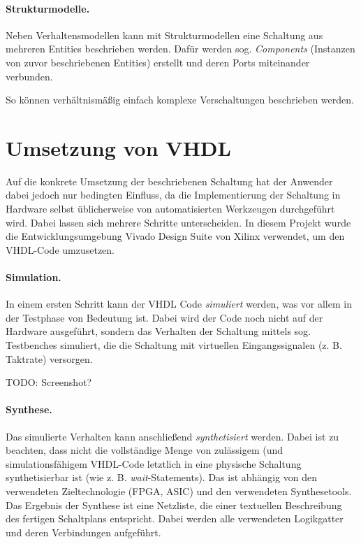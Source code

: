 \paragraph{Strukturmodelle.} Neben Verhaltensmodellen kann mit Strukturmodellen eine Schaltung aus mehreren Entities beschrieben werden. Dafür werden sog. \textit{Components} (Instanzen von zuvor beschriebenen Entities) erstellt und deren Ports miteinander verbunden.

So können verhältnismäßig einfach komplexe Verschaltungen beschrieben werden.
 
\section{Umsetzung von VHDL}
Auf die konkrete Umsetzung der beschriebenen Schaltung hat der Anwender dabei jedoch nur bedingten Einfluss, da die Implementierung der Schaltung in Hardware selbst üblicherweise von automatisierten Werkzeugen durchgeführt wird. Dabei lassen sich mehrere Schritte unterscheiden. In diesem Projekt wurde die Entwicklungsumgebung Vivado Design Suite von Xilinx verwendet, um den VHDL-Code umzusetzen.

\paragraph{Simulation.} In einem ersten Schritt kann der VHDL Code \emph{simuliert} werden, was vor allem in der Testphase von Bedeutung ist. Dabei wird der Code noch nicht auf der Hardware ausgeführt, sondern das Verhalten der Schaltung mittels sog. Testbenches simuliert, die die Schaltung mit virtuellen Eingangssignalen (z. B. Taktrate) versorgen. 

TODO: Screenshot?

\paragraph{Synthese.} Das simulierte Verhalten kann anschließend \emph{synthetisiert} werden. Dabei ist zu beachten, dass nicht die vollständige Menge von zulässigem (und simulationsfähigem VHDL-Code letztlich in eine physische Schaltung synthetisierbar ist (wie z. B. \emph{wait}-Statements). Das ist abhängig von den verwendeten Zieltechnologie (FPGA, ASIC) und den verwendeten Synthesetools. Das Ergebnis der Synthese ist eine Netzliste, die einer textuellen Beschreibung des fertigen Schaltplans entspricht. Dabei werden alle verwendeten Logikgatter und deren Verbindungen aufgeführt.

